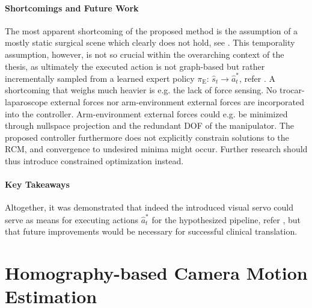 \paragraph{Shortcomings and Future Work} The most apparent shortcoming of the proposed method is the assumption of a mostly static surgical scene which clearly does not hold, see . This temporality assumption, however, is not so crucial within the overarching context of the thesis, as ultimately the executed action is not graph-based but rather incrementally sampled from a learned expert policy $\pi_\text{E}:\, \hat{s}_t \rightarrow \hat{a}^*_t$, refer . A shortcoming that weighs much heavier is e.g. the lack of force sensing. No trocar-laparoscope external forces nor arm-environment external forces are incorporated into the controller. Arm-environment external forces could e.g. be minimized through nullspace projection and the redundant DOF of the manipulator. The proposed controller furthermore does not explicitly constrain solutions to the RCM, and convergence to undesired minima might occur. Further research should thus introduce constrained optimization instead.

\paragraph{Key Takeaways} Altogether, it was demonstrated that indeed the introduced visual servo could serve as means for executing actions $\hat{a}^*_t$ for the hypothesized pipeline, refer , but that future improvements would be necessary for successful clinical translation.

\section{Homography-based Camera Motion Estimation}
\label{con:sec:hom_est}
